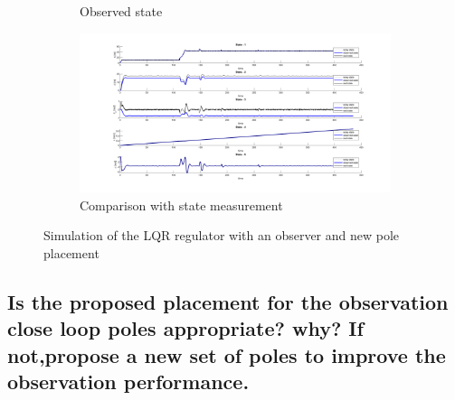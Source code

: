 \begin{figure}[H]
\begin{subfigure}[b]{0.8\textwidth}
         \caption{Observed state}
         \label{fig:2State}
     \end{subfigure}
     \begin{subfigure}[b]{0.8\textwidth}
         \centering
         \includegraphics[width=\textwidth]{Latex report/image/ex2/obs2.png}
         \caption{Comparison with state measurement}
         \label{fig:2Obs}
     \end{subfigure}
    \caption{Simulation of the LQR regulator with an observer and new pole placement}
    \label{fig:sim2}
\end{figure}




\subsection{Is the proposed placement for the observation close loop poles appropriate? why? If not,propose a new set of poles to improve the observation performance.}

